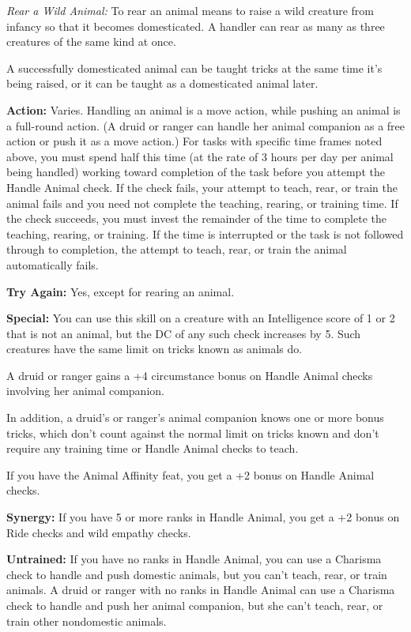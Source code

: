 \textit{Rear a Wild Animal:} To rear an animal means to raise a wild creature from infancy so that it becomes domesticated. A handler can rear as many as three creatures of the same kind at once.

A successfully domesticated animal can be taught tricks at the same time it’s being raised, or it can be taught as a domesticated animal later.

\textbf{Action:} Varies. Handling an animal is a move action, while pushing an animal is a full-round action. (A druid or ranger can handle her animal companion as a free action or push it as a move action.) For tasks with specific time frames noted above, you must spend half this time (at the rate of 3 hours per day per animal being handled) working toward completion of the task before you attempt the Handle Animal check. If the check fails, your attempt to teach, rear, or train the animal fails and you need not complete the teaching, rearing, or training time. If the check succeeds, you must invest the remainder of the time to complete the teaching, rearing, or training. If the time is interrupted or the task is not followed through to completion, the attempt to teach, rear, or train the animal automatically fails.

\textbf{Try Again:} Yes, except for rearing an animal.

\textbf{Special:} You can use this skill on a creature with an Intelligence score of 1 or 2 that is not an animal, but the DC of any such check increases by 5. Such creatures have the same limit on tricks known as animals do.

A druid or ranger gains a +4 circumstance bonus on Handle Animal checks involving her animal companion.

In addition, a druid’s or ranger’s animal companion knows one or more bonus tricks, which don’t count against the normal limit on tricks known and don’t require any training time or Handle Animal checks to teach.

If you have the Animal Affinity feat, you get a +2 bonus on Handle Animal checks.

\textbf{Synergy:} If you have 5 or more ranks in Handle Animal, you get a +2 bonus on Ride checks and wild empathy checks.

\textbf{Untrained:} If you have no ranks in Handle Animal, you can use a Charisma check to handle and push domestic animals, but you can’t teach, rear, or train animals. A druid or ranger with no ranks in Handle Animal can use a Charisma check to handle and push her animal companion, but she can’t teach, rear, or train other nondomestic animals.


